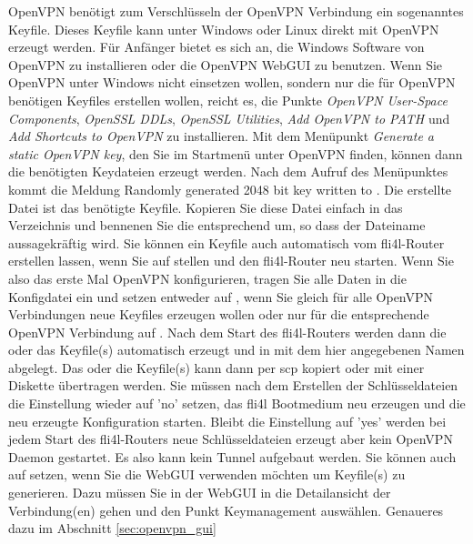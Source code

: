 \begin{description}
  OpenVPN benötigt zum Verschlüsseln der OpenVPN Verbindung ein
  sogenanntes Keyfile. Dieses Keyfile kann unter Windows oder Linux
  direkt mit OpenVPN erzeugt werden. Für Anfänger bietet es sich an,
  die Windows Software von OpenVPN zu installieren oder die OpenVPN
  WebGUI zu benutzen. Wenn Sie OpenVPN unter Windows nicht einsetzen
  wollen, sondern nur die für OpenVPN benötigen Keyfiles erstellen
  wollen, reicht es, die Punkte \emph{OpenVPN User-Space Components},
  \emph{OpenSSL DDLs}, \emph{OpenSSL Utilities}, \emph{Add OpenVPN to
  PATH} und \emph{Add Shortcuts to OpenVPN} zu installieren. Mit dem
  Menüpunkt \emph{Generate a static OpenVPN key}, den Sie im Startmenü
  unter OpenVPN finden, können dann die benötigten Keydateien erzeugt
  werden. Nach dem Aufruf des Menüpunktes kommt die Meldung
  \glqq{}Randomly generated 2048 bit key written to
  \grqq{}. Die erstellte
   Datei ist das benötigte Keyfile. Kopieren Sie diese
  Datei einfach in das Verzeichnis  und
  bennenen Sie die  entsprechend um, so dass der
  Dateiname aussagekräftig wird. Sie können ein Keyfile auch
  automatisch vom fli4l-Router erstellen lassen, wenn Sie
   auf  stellen und den
  fli4l-Router neu starten. Wenn Sie also das erste Mal OpenVPN
  konfigurieren, tragen Sie alle Daten in die Konfigdatei ein und
  setzen entweder
  auf , wenn Sie gleich für alle OpenVPN Verbindungen neue
  Keyfiles erzeugen wollen oder nur für die entsprechende OpenVPN
  Verbindung  auf . Nach
  dem Start des fli4l-Routers werden dann die oder das Keyfile(s)
  automatisch erzeugt und in  mit dem hier
  angegebenen Namen abgelegt.  Das oder die Keyfile(s) kann dann per
  scp kopiert oder mit einer Diskette übertragen werden.  Sie müssen
  nach dem Erstellen der Schlüsseldateien die Einstellung wieder auf
  'no' setzen, das fli4l Bootmedium neu erzeugen und die neu
  erzeugte Konfiguration starten. Bleibt die Einstellung auf 'yes'
  werden bei jedem Start des fli4l-Routers neue Schlüsseldateien
  erzeugt aber kein OpenVPN Daemon gestartet. Es also kann kein Tunnel
  aufgebaut werden. Sie können  auch
  auf  setzen, wenn Sie die WebGUI verwenden möchten um
  Keyfile(s) zu generieren. Dazu müssen Sie in der WebGUI in die
  Detailansicht der Verbindung(en) gehen und den Punkt Keymanagement
  auswählen. Genaueres dazu im Abschnitt \ref{sec:openvpn_gui}


\end{description}

